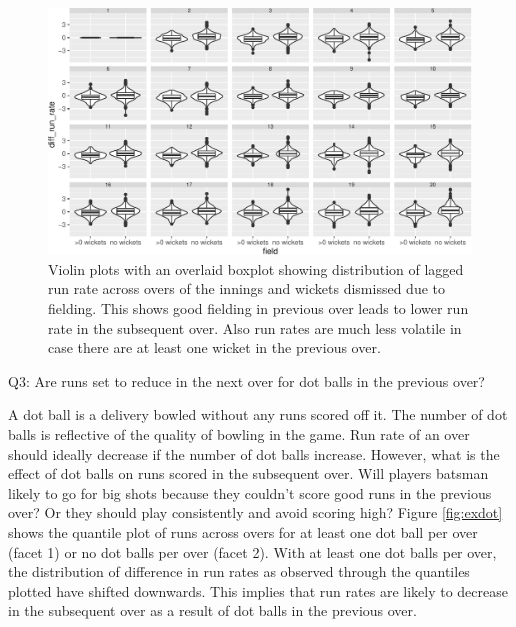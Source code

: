 \documentclass[12pt]{article}
\begin{document}
\begin{figure}

{\centering \includegraphics[width=\textwidth]{figure/field-1} 

}

\caption{Violin plots with an overlaid boxplot showing distribution of lagged run rate across overs of the innings and wickets dismissed due to fielding. This shows good fielding in previous over leads to lower run rate in the subsequent over. Also run rates are much less volatile in case there are at least one wicket in the previous over.}\label{fig:field}
\end{figure}

Q3: Are runs set to reduce in the next over for dot balls in the previous over?

A dot ball is a delivery bowled without any runs scored off it. The number of dot balls is reflective of the quality of bowling in the game. Run rate of an over should ideally decrease if the number of dot balls increase. However, what is the effect of dot balls on runs scored in the subsequent over. Will players batsman likely to go for big shots because they couldn't score good runs in the previous over? Or they should play consistently and avoid scoring high? Figure \ref{fig:exdot} shows the quantile plot of runs across overs for at least one dot ball per over (facet 1) or no dot balls per over (facet 2).
With at least one dot balls per over, the distribution of difference in run rates as observed through the quantiles plotted have shifted downwards. This implies that run rates are likely to decrease in the subsequent over as a result of dot balls in the previous over.
\end{document}

